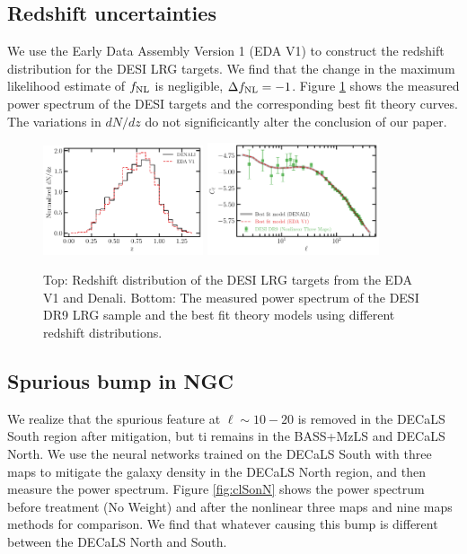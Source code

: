 \subsection{Redshift uncertainties}\label{ssec:nzuncer}
We use the Early Data Assembly Version 1 (EDA V1) to construct the redshift distribution for the DESI LRG targets. We find that the change in the maximum likelihood estimate of $f_{\rm NL}$ is negligible, $\Delta f_{\rm NL}=-1$. Figure \ref{fig:cl_nz} shows the measured power spectrum of the DESI targets and the corresponding best fit theory curves. The variations in $dN/dz$ do not significicantly alter the conclusion of our paper.
\begin{figure}
\raggedleft
\includegraphics[width=0.42\textwidth]{figures/nz_lrg_eda.pdf}
\includegraphics[width=0.45\textwidth]{figures/cl_nz.pdf}\caption{Top: Redshift distribution of the DESI LRG targets from the EDA V1 and Denali. Bottom: The measured power spectrum of the DESI DR9 LRG sample and the best fit theory models using different redshift distributions.}\label{fig:cl_nz}
\end{figure}




\subsection{Spurious bump in NGC}\label{ssec:ndecalsbump}
We realize that the spurious feature at $\ell \sim 10-20$ is removed in the DECaLS South region after mitigation, but ti remains in the BASS+MzLS and DECaLS North. We use the neural networks trained on the DECaLS South with three maps to mitigate the galaxy density in the DECaLS North region, and then measure the power spectrum. Figure \ref{fig:clSonN} shows the power spectrum before treatment (No Weight) and after the nonlinear three maps and nine maps methods for comparison. We find that whatever causing this bump is different between the DECaLS North and South.

